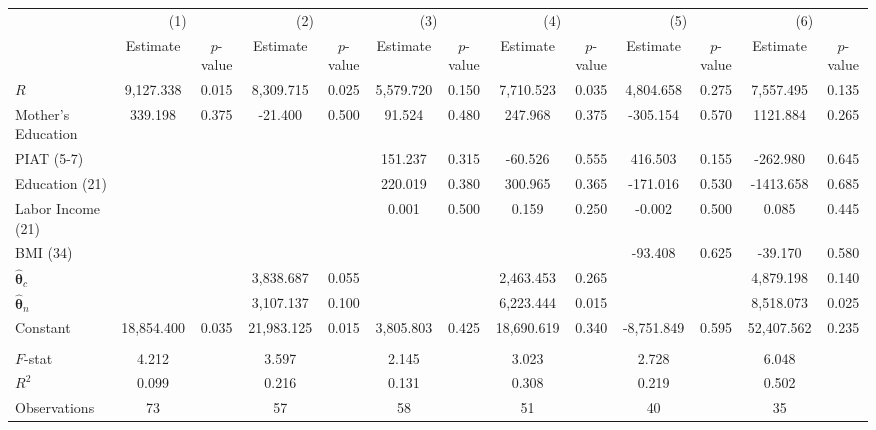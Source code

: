 \begin{tabular}{lcccccccccccc} \toprule
 & \multicolumn{2}{c}{(1)}  &  \multicolumn{2}{c}{(2)}  &  \multicolumn{2}{c}{(3)}  &  \multicolumn{2}{c}{(4)}  & \multicolumn{2}{c}{(5)} & \multicolumn{2}{c}{(6)} \\  
 & Estimate & $p$-value & Estimate & $p$-value & Estimate & $p$-value & Estimate & $p$-value & Estimate & $p$-value & Estimate & $p$-value \\ \midrule
$R$ &  9,127.338 &     0.015 &  8,309.715 &     0.025 &  5,579.720 &     0.150 &  7,710.523 &     0.035 &  4,804.658 &     0.275 &  7,557.495 &     0.135 \\  
Mother's Education &   339.198 &     0.375 &   -21.400 &     0.500 &    91.524 &     0.480 &   247.968 &     0.375 &  -305.154 &     0.570 &  1121.884 &     0.265 \\  
PIAT (5-7) &         &          &          &          &    151.237 &     0.315 &   -60.526 &     0.555 &   416.503 &     0.155 &  -262.980 &     0.645 \\  
Education (21) &         &          &          &          &    220.019 &     0.380 &   300.965 &     0.365 &  -171.016 &     0.530 & -1413.658 &     0.685 \\  
Labor Income (21) &         &          &          &          &      0.001 &     0.500 &     0.159 &     0.250 &    -0.002 &     0.500 &     0.085 &     0.445 \\  
BMI (34) &         &          &          &          &          &          &          &          &    -93.408 &     0.625 &   -39.170 &     0.580 \\  
$\hat{\bm{\theta}}_{c}$ &         &          &   3,838.687 &     0.055 &         &          &   2,463.453 &     0.265 &         &          &   4,879.198 &     0.140 \\  
$\hat{\bm{\theta}}_{n}$ &         &          &   3,107.137 &     0.100 &         &          &   6,223.444 &     0.015 &         &          &   8,518.073 &     0.025 \\  
Constant & 18,854.400 &     0.035 & 21,983.125 &     0.015 &  3,805.803 &     0.425 & 18,690.619 &     0.340 & -8,751.849 &     0.595 & 52,407.562 &     0.235 \\ \\  \midrule
$F$-stat &     4.212 &      &     3.597 &      &     2.145 &      &     3.023 &      &     2.728 &      &     6.048 &     \\  
$R^2$ &     0.099 &      &     0.216 &      &     0.131 &      &     0.308 &      &     0.219 &      &     0.502 &     \\  
Observations &    73 &      &    57 &     &    58 &    &    51 &      &    40 &      &    35 &     \\  
\bottomrule \end{tabular}
